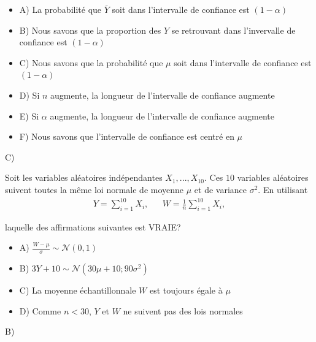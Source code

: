 \begin{questions}
\begin{itemize}[label = { }]
    \item A) La probabilité que $\overline{Y}$ soit dans l'intervalle de confiance est $(1-\alpha)$
    \item B) Nous savons que la proportion des $Y$ se retrouvant dans l'invervalle de confiance est $(1-\alpha)$
    \item C) Nous savons que la probabilité que $\mu$ soit dans l'intervalle de confiance est $(1-\alpha)$
    \item D) Si $n$ augmente, la longueur de l'intervalle de confiance augmente
    \item E) Si $\alpha$ augmente, la longueur de l'intervalle de confiance augmente
    \item F) Nous savons que l'intervalle de confiance est centré en $\mu$
\end{itemize}

\qcmrep{}

\begin{solution}
C)
\end{solution}

\question[3]\label{TCL}

Soit les variables aléatoires indépendantes $X_1,...,X_{10}$. Ces $10$ variables aléatoires suivent toutes la même loi normale de moyenne $\mu$ et de variance $\sigma^2$. En utilisant
\begin{align*}
    Y=\displaystyle \sum_{i=1}^{10} X_i, & & W=\displaystyle \frac{1}{n}\sum_{i=1}^{10} X_i,
\end{align*}

laquelle des affirmations suivantes est VRAIE? 

\begin{itemize}[label = {}]
\item A) $\frac{W-\mu}{\sigma}\sim\mathcal{N}(0,1)$
\item B) $3Y+10\sim \mathcal{N}(30\mu + 10; 90\sigma^2)$ 
\item C) La moyenne échantillonnale $W$ est toujours égale à $\mu$
\item D) Comme $n<30$, $Y$ et $W$ ne suivent pas des lois normales
\end{itemize}

\qcmrep{}

\begin{solution}
    B)
\end{solution}


\end{questions}
